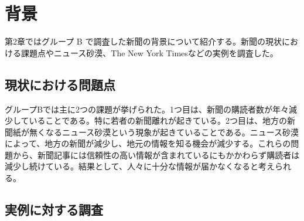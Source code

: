 \chapter{背景}
第2章ではグループ B で調査した新聞の背景について紹介する。新聞の現状における課題点やニュース砂漠、The New York Timesなどの実例を調査した。
\section{現状における問題点}
グループBでは主に2つの課題が挙げられた。1つ目は、新聞の購読者数が年々減少していることである。特に若者の新聞離れが起きている。2つ目は、地方の新聞紙が無くなるニュース砂漠という現象が起きていることである。ニュース砂漠によって、地方の新聞が減少し、地元の情報を知る機会が減少する。これらの問題から、新聞記事には信頼性の高い情報が含まれているにもかかわらず購読者は減少し続けている。結果として、人々に十分な情報が届かなくなると考えられる。

\section{実例に対する調査}
